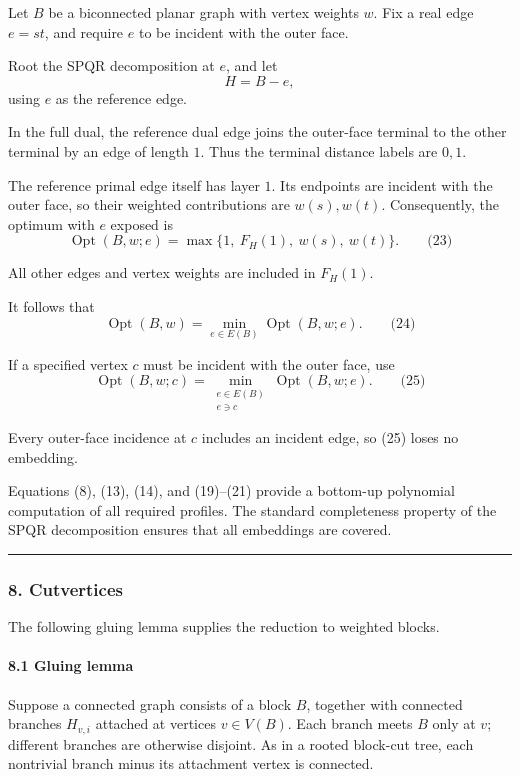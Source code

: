 \documentclass[
  11pt,
  a4paper,
]{article}
\begin{document}
Let \(B\) be a biconnected planar graph with vertex weights \(w\). Fix a
real edge \(e=st\), and require \(e\) to be incident with the outer
face.

Root the SPQR decomposition at \(e\), and let \[
H=B-e,
\] using \(e\) as the reference edge.

In the full dual, the reference dual edge joins the outer-face terminal
to the other terminal by an edge of length \(1\). Thus the terminal
distance labels are \(0,1\).

The reference primal edge itself has layer \(1\). Its endpoints are
incident with the outer face, so their weighted contributions are
\(w(s),w(t)\). Consequently, the optimum with \(e\) exposed is \[
\operatorname{Opt}(B,w;e)
=
\max\{1,\ F_H(1),\ w(s),\ w(t)\}.
\qquad\text{(23)}
\]

All other edges and vertex weights are included in \(F_H(1)\).

It follows that \[
\operatorname{Opt}(B,w)
=
\min_{e\in E(B)}\operatorname{Opt}(B,w;e).
\qquad\text{(24)}
\]

If a specified vertex \(c\) must be incident with the outer face, use \[
\operatorname{Opt}(B,w;c)
=
\min_{\substack{e\in E(B)\\e\ni c}}
\operatorname{Opt}(B,w;e).
\qquad\text{(25)}
\]

Every outer-face incidence at \(c\) includes an incident edge, so (25)
loses no embedding.

Equations (8), (13), (14), and (19)--(21) provide a bottom-up polynomial
computation of all required profiles. The standard completeness property
of the SPQR decomposition ensures that all embeddings are covered.

\begin{center}\rule{0.5\linewidth}{0.5pt}\end{center}

\subsubsection{8. Cutvertices}\label{cutvertices}

The following gluing lemma supplies the reduction to weighted blocks.

\paragraph{8.1 Gluing lemma}\label{gluing-lemma}

Suppose a connected graph consists of a block \(B\), together with
connected branches \(H_{v,i}\) attached at vertices \(v\in V(B)\). Each
branch meets \(B\) only at \(v\); different branches are otherwise
disjoint. As in a rooted block-cut tree, each nontrivial branch minus
its attachment vertex is connected.
\end{document}
